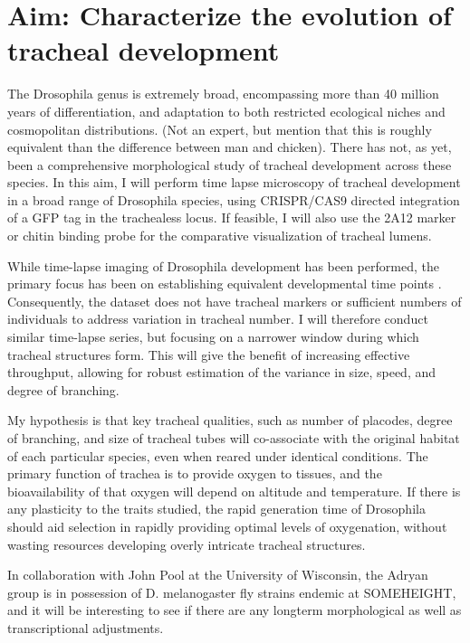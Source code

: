 \documentclass{proposal}
\begin{document}
\section{Aim: Characterize the evolution of tracheal development}

The Drosophila genus is extremely broad, encompassing more than 40 million years of differentiation, and adaptation to both restricted ecological niches and cosmopolitan distributions. (Not an expert, but mention that this is roughly equivalent than the difference between man and chicken). There has not, as yet, been a comprehensive morphological study of tracheal development across these species.  In this aim, I will perform time lapse microscopy of tracheal development in a broad range of Drosophila species, using CRISPR/CAS9 directed integration of a GFP tag in the trachealess locus. If feasible, I will also use the 2A12 marker or chitin binding probe for the comparative visualization of tracheal lumens.


While time-lapse imaging of Drosophila development has been performed, the primary focus has been on establishing equivalent developmental time points \cite{Kuntz:2014bc}.  Consequently, the dataset does not have tracheal markers or sufficient numbers of individuals to address variation in tracheal number.  I will therefore conduct similar time-lapse series, but focusing on a narrower window during which tracheal structures form.  This will give the benefit of increasing effective throughput, allowing for robust estimation of the variance in size, speed, and degree of branching. 

My hypothesis is that key tracheal qualities, such as number of placodes, degree of branching, and size of tracheal tubes will co-associate with the original habitat of each particular species, even when reared under identical conditions.  The primary function of trachea is to provide oxygen to tissues, and the bioavailability of that oxygen will depend on altitude and temperature. If there is any plasticity to the traits studied, the rapid generation time of Drosophila should aid selection in rapidly providing optimal levels of oxygenation, without wasting resources developing overly intricate tracheal structures. 


In collaboration with John Pool at the University of Wisconsin, the Adryan group is in possession of D. melanogaster fly strains endemic at SOMEHEIGHT, and it will be interesting to see if there are any longterm morphological as well as transcriptional adjustments.
\end{document}
